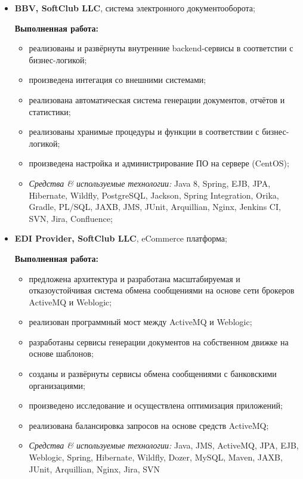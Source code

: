 \documentclass[a4paper, 12pt]{article}
\newcommand{\position}[1]{
    \textbf{#1}}
\newcommand{\itemlabel}[1]{
    \textit{#1:}}
\begin{document}
    \begin{itemize}
        \item \position{BBV, SoftClub LLC}, система электронного документооборота;

            \textbf{Выполненная работа:}
			\begin{itemize}
  				\item реализованы и развёрнуты внутренние backend-сервисы в соответстии с бизнес-логикой;
  				\item произведена интегация со внешними системами;
				\item реализована автоматическая система генерации документов, отчётов и статистики;
  				\item реализованы хранимые процедуры и функции в соответствии с бизнес-логикой;
  				\item произведена настройка и администрирование ПО на сервере (CentOS);
			\end{itemize}
	
            \begin{itemize}
                \item \itemlabel{Средства \& используемые технологии} Java 8, Spring, EJB, JPA, Hibernate, Wildfly, PostgreSQL, Jackson, Spring Integration, Orika,  Gradle, PL/SQL, JAXB, JMS, JUnit, Arquillian, Nginx, Jenkins CI, SVN, Jira, Confluence;
            \end{itemize}
    \end{itemize}
    
        \begin{itemize}
        \item \position{EDI Provider, SoftClub LLC}, eCommerce платформа;

            \textbf{Выполненная работа:}
			\begin{itemize}
  				\item предложена архитектура и разработана масштабируемая и отказоустойчивая система обмена сообщениями на основе сети брокеров ActiveMQ и Weblogic;
  				\item реализован программный мост между ActiveMQ и Weblogic;
  				\item разработаны сервисы генерации документов на собственном движке на основе шаблонов; 
				\item созданы и развёрнуты сервисы обмена сообщениями с банковскими организациями;
  				\item произведено исследование и осуществлена оптимизация приложений;
  				\item реализована балансировка запросов на основе средств ActiveMQ;
			\end{itemize}
	
            \begin{itemize}
                \item \itemlabel{Средства \& используемые технологии} Java, JMS, ActiveMQ, JPA, EJB, Weblogic, Spring, Hibernate, Wildfly, Dozer, MySQL, Maven, JAXB, JUnit, Arquillian, Nginx, Jira, SVN
            \end{itemize}
    \end{itemize}
    
\end{document}
